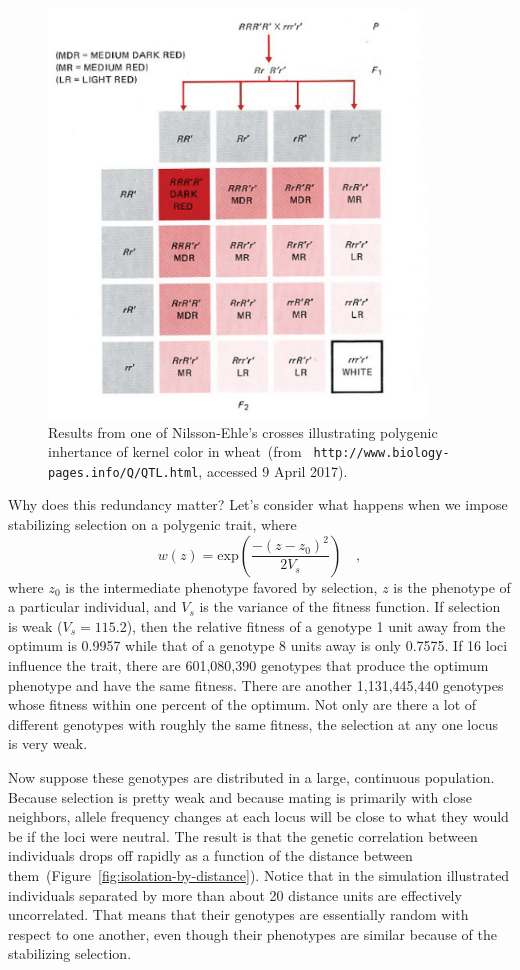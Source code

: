 \documentclass[12pt]{article}
\begin{document}
\begin{figure}
  \begin{center}
    \includegraphics[width=10cm]{Nilsson-Ehle.eps}
  \end{center}
  \caption{Results from one of Nilsson-Ehle's crosses illustrating
    polygenic inhertance of kernel color in wheat~(from {\tt
      http://www.biology-pages.info/Q/QTL.html}, accessed 9 April 2017).}\label{fig:redundancy}
\end{figure}

Why does this redundancy matter? Let's consider what happens when we
impose stabilizing selection on a polygenic trait, where
$$
w(z) = \mbox{exp}\left(\frac{-(z - z_0)^2}{2V_s}\right) \quad ,
$$
where $z_0$ is the intermediate phenotype favored by selection, $z$ is
the phenotype of a particular individual, and $V_s$ is the variance of
the fitness function. If selection is weak ($V_s = 115.2$), then the
relative fitness of a genotype 1 unit away from the optimum is 0.9957
while that of a genotype 8 units away is only 0.7575. If 16 loci
influence the trait, there are 601,080,390 genotypes that produce the
optimum phenotype and have the same fitness. There are another
1,131,445,440 genotypes whose fitness within one percent of the
optimum. Not only are there a lot of different genotypes with roughly
the same fitness, the selection at any one locus is very weak.

Now suppose these genotypes are distributed in a large, continuous
population. Because selection is pretty weak and because mating is
primarily with close neighbors, allele frequency changes at each locus
will be close to what they would be if the loci were neutral. The
result is that the genetic correlation between individuals drops off
rapidly as a function of the distance between
them~(Figure~\ref{fig:isolation-by-distance}). Notice that in the
simulation illustrated individuals separated by more than about 20
distance units are effectively uncorrelated. That means that their
genotypes are essentially random with respect to one another, even
though their phenotypes are similar because of the stabilizing
selection. 
\end{document}
